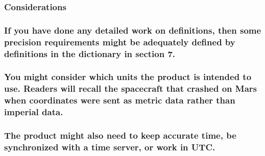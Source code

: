 \documentclass[
]{article}
\begin{document}
\hypertarget{considerations-27}{%
\subsubsection{Considerations}\label{considerations-27}}

\hypertarget{if-you-have-done-any-detailed-work-on-definitions-then-some-precision-requirements-might-be-adequately-defined-by-definitions-in-the-dictionary-in-section-7.}{%
\subsubsection{If you have done any detailed work on definitions, then
some precision requirements might be adequately defined by definitions
in the dictionary in section
7.}\label{if-you-have-done-any-detailed-work-on-definitions-then-some-precision-requirements-might-be-adequately-defined-by-definitions-in-the-dictionary-in-section-7.}}

\hypertarget{you-might-consider-which-units-the-product-is-intended-to-use.-readers-will-recall-the-spacecraft-that-crashed-on-mars-when-coordinates-were-sent-as-metric-data-rather-than-imperial-data.}{%
\subsubsection{\texorpdfstring{You might consider which units the
product is intended to use. Readers will recall the spacecraft that
crashed on Mars when coordinates were sent as metric data rather than
imperial data.
}{You might consider which units the product is intended to use. Readers will recall the spacecraft that crashed on Mars when coordinates were sent as metric data rather than imperial data. }}\label{you-might-consider-which-units-the-product-is-intended-to-use.-readers-will-recall-the-spacecraft-that-crashed-on-mars-when-coordinates-were-sent-as-metric-data-rather-than-imperial-data.}}

\hypertarget{the-product-might-also-need-to-keep-accurate-time-be-synchronized-with-a-time-server-or-work-in-utc.}{%
\subsubsection{\texorpdfstring{The product might also need to keep
accurate time, be synchronized with a time server, or work in UTC.
}{The product might also need to keep accurate time, be synchronized with a time server, or work in UTC. }}\label{the-product-might-also-need-to-keep-accurate-time-be-synchronized-with-a-time-server-or-work-in-utc.}}
\end{document}

